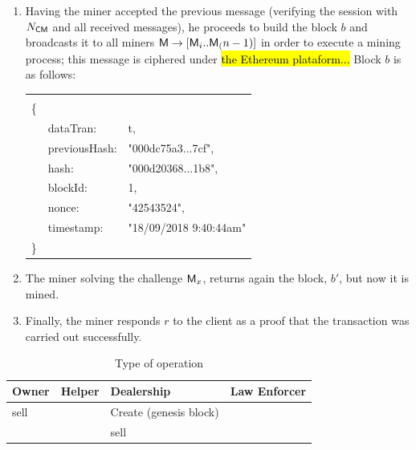 \begin{enumerate}
        Both \textit{plate} and \textit{id} are used to identify the car, 
        \textit{timestamp} used to identify the time, $N_{\Client\Server}$
        used to distinguish the session; the public key $K_{pub(X)}$
        of the next owner client, it could be the own $\Client$ or another
        owner;
        \textit{miner} and 
        \textit{client} fields to identify the participants in the transaction; 
        and $T$ stating
        what kind of operation is carrying out (see Table~\ref{table:operations}).
    \item Having the miner accepted the previous message (verifying the  
        session with $N_{\Client\Server}$ and all received messages), he proceeds to build 
        the block $b$ and broadcasts it to all miners $\textsf{M}\rightarrow [\textsf{M}_i .. \textsf{M}_(n-1)]$
        in order to execute a mining process; 
        this message is ciphered under \hl{the Ethereum plataform...}
        Block $b$ is as follows:
        \begin{tabular}{lll}
                &               & \\ 
            \{  &               &    \\
                & dataTran:     & t,  \\
                & previousHash: & "000dc75a3...7cf", \\
                & hash:         & "000d20368...1b8",\\
                & blockId:      & 1,\\
                & nonce:        & "42543524",\\
                & timestamp:    & "18/09/2018 9:40:44am" \\
            \}  &               &   \\
        \end{tabular}
        
    \item The miner solving the challenge $\textsf{M}_x$, returns again the block, $b'$, 
        but now it is mined. 
    \item Finally, the miner responds $r$ to the client as a proof that the transaction 
        was carried out successfully.
\end{enumerate}
   
\begin{table}[htb]
\footnotesize
    \begin{center}
    \caption{Type of operation}
    \label{table:operations}
        \begin{tabular}{llll}
            Owner   & Helper        & Dealership                & Law Enforcer\\ \hline
            sell    &               & Create (genesis block)    \\ \hline
                    &               & sell                      \\ \hline
        \end{tabular}
    \end{center}
\end{table}


